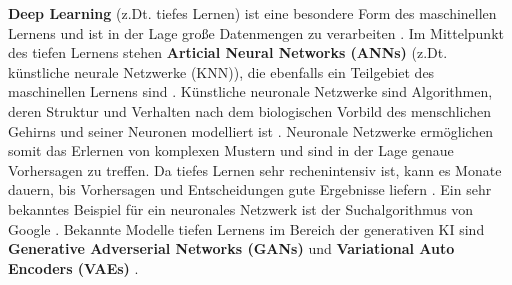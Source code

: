 \textbf{Deep Learning} (z.Dt. tiefes Lernen) ist eine besondere Form des maschinellen Lernens und ist in der Lage große Datenmengen zu verarbeiten \cite{deep-learning-ibm}.
Im Mittelpunkt des tiefen Lernens stehen \textbf{Articial Neural Networks (ANNs)} (z.Dt. künstliche neurale Netzwerke (KNN)), die ebenfalls ein Teilgebiet des maschinellen Lernens sind \cite{ibm-ai-ml-dl}.
Künstliche neuronale Netzwerke sind Algorithmen, deren Struktur und Verhalten nach dem biologischen Vorbild des menschlichen Gehirns und seiner Neuronen modelliert ist \cite{deep-learning-ibm,deep-learning-data-absolut}.
Neuronale Netzwerke ermöglichen somit das Erlernen von komplexen Mustern und sind in der Lage genaue Vorhersagen zu treffen.
Da tiefes Lernen sehr rechenintensiv ist, kann es Monate dauern, bis Vorhersagen und Entscheidungen gute Ergebnisse liefern \cite{deep-learning-data-absolut}.
Ein sehr bekanntes Beispiel für ein neuronales Netzwerk ist der Suchalgorithmus von Google \cite{ibm-ai-ml-dl}.
Bekannte Modelle tiefen Lernens im Bereich der generativen KI sind \textbf{Generative Adverserial Networks (GANs)} \cite{goodfellow-gan} und \textbf{Variational Auto Encoders (VAEs)} \cite{kigma-vaes}.


